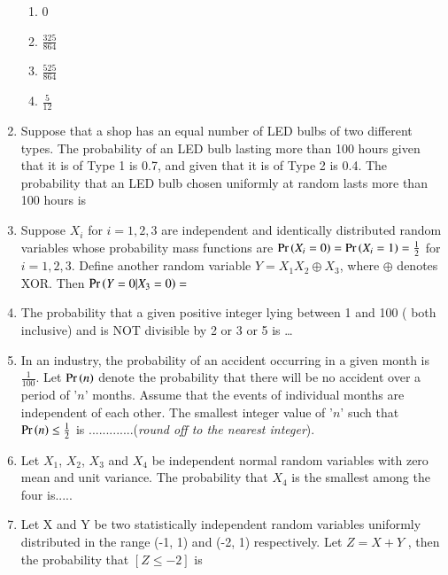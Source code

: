 \documentclass[journal,12pt,twocolumn]{IEEEtran}
\begin{document}
\begin{enumerate}
\begin{enumerate}[label=(\alph*)]
\item $0$\\
\item $\frac{325}{864}$ \\
\item$\frac{525}{864}$\\
\item$\frac{5}{12}$
\end{enumerate}
\solution

%
\item Suppose that a shop has an equal number of LED bulbs of two different types. The probability of an LED bulb lasting more than 100 hours given that it is of Type 1 is 0.7, and given that it is of Type 2 is 0.4. The probability that an LED bulb chosen uniformly at random lasts more than 100 hours is
\\
\solution 

%
\item Suppose $X_i$ for $i = 1, 2, 3$ are independent
and identically distributed random variables
whose probability mass functions are
$\Pr\left(X_i = 0\right) = \Pr\left(X_i = 1\right) = \frac{1}{2}$ for $i = 1, 2, 3$.
Define another random variable $Y = X_1 X_2 \oplus X_3$, where $\oplus$ denotes XOR. Then $\Pr\left(Y = 0|X_3 = 0\right) =$
\\
\solution 

%
\item The probability that a given positive integer lying between 1 and 100 ( both inclusive) and is NOT divisible by 2 or 3 or 5 is \dots
\\
\solution

%
\item  In an industry, the probability of an accident occurring in a given month is $\frac{1}{100}$. Let $\Pr\left(n\right)$ denote the probability that there will be no accident over a period of '$n$' months. Assume that the events of individual months are independent of each other. The smallest integer value of '$n$' such that $\Pr\left(n\right)\le \frac{1}{2} $ is .............(\textit{round off to the nearest integer}).\\
%
\solution

%
\item Let $X_1$, $X_2$, $X_3$ and $X_4$ be independent normal random variables with zero mean and unit variance. The probability that $X_4$ is the smallest among the four is..... 
\\
\solution

%
\item Let X and Y be two statistically independent random variables uniformly distributed in the range (-1, 1) and (-2, 1) respectively. Let $Z = X +Y$ , then the probability that $[Z \leq -2]$ is\\

\end{enumerate}
\end{document}
